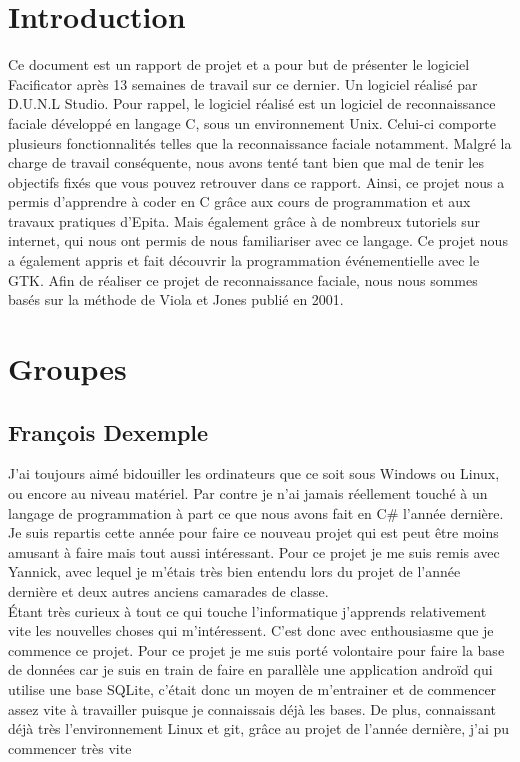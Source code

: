 \documentclass[12pt,a4paper]{article}
\begin{document}
\newpage
\tableofcontents

\newpage
\section{Introduction}
Ce document est un rapport de projet et a pour but de présenter le logiciel Facificator après 13 semaines de travail sur ce dernier. Un logiciel réalisé par D.U.N.L Studio. Pour rappel, le logiciel réalisé est un logiciel de reconnaissance faciale développé en langage C, sous un environnement Unix. Celui-ci comporte plusieurs fonctionnalités telles que la reconnaissance faciale notamment.
Malgré la charge de travail conséquente, nous avons tenté tant bien que mal de tenir les objectifs fixés que vous pouvez retrouver dans ce rapport. Ainsi, ce projet nous a permis d'apprendre à coder en C grâce aux cours de programmation et aux travaux pratiques d'Epita. Mais également grâce à de nombreux tutoriels sur internet, qui nous ont permis de nous familiariser avec ce langage. Ce projet nous a également appris et fait découvrir la programmation événementielle avec le GTK.
Afin de réaliser ce projet de reconnaissance faciale, nous nous sommes basés sur la méthode de Viola et Jones publié en 2001.


\newpage

\section{Groupes}
\subsection{François Dexemple}
J'ai toujours aimé bidouiller les ordinateurs que ce soit sous Windows ou Linux, ou encore au niveau matériel. Par contre je n'ai jamais réellement touché à un langage de programmation à part ce que nous avons fait en C\# l'année dernière.
Je suis repartis cette année pour faire ce nouveau projet qui est peut être moins amusant à faire mais tout aussi intéressant. Pour ce projet je me suis remis avec Yannick, avec lequel je m'étais très bien entendu lors du projet de l'année dernière et deux autres anciens camarades de classe.\\
Étant très curieux à tout ce qui touche l'informatique j'apprends relativement vite les nouvelles choses qui m'intéressent. C'est donc avec enthousiasme que je commence ce projet. Pour ce projet je me suis porté volontaire pour faire la base de données car je suis en train de faire en parallèle une application androïd qui utilise une base SQLite, c'était donc un moyen de m'entrainer et de commencer assez vite à travailler puisque je connaissais déjà les bases. De plus, connaissant déjà très l'environnement Linux et git, grâce au projet de l'année dernière, j'ai pu commencer très vite 
\end{document}
